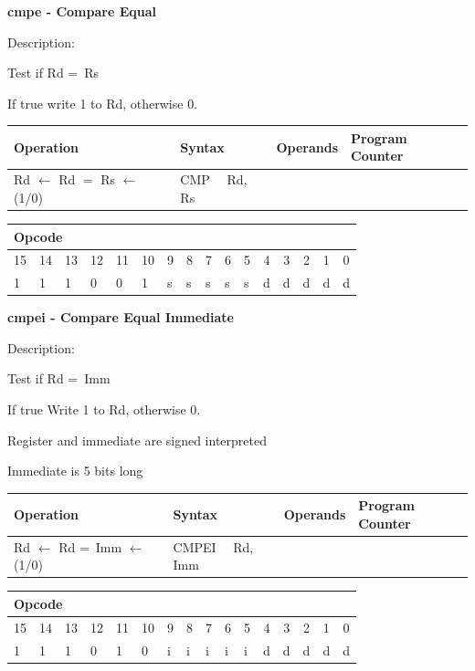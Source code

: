 \documentclass[%
	pdftex,
	a4paper,
	oneside,
	bibtotoc,%
	idxtotoc,%
	bibtotocnumbered,
	halfparskip,%
]{scrbook}
\begin{document}
\bigskip

\textbf{cmpe - Compare Equal}

Description:

Test if Rd =\ Rs

If true write 1 to Rd, otherwise 0.

\begin{tabular}{|l|l|l|l|}
\hline
Operation & Syntax & Operands & Program Counter \\ \hline
Rd $\leftarrow $ Rd $=$ Rs $\leftarrow $ (1/0) & CMP \ \ Rd, Rs &  &  \\ 
\hline
\end{tabular}

\begin{tabular}{|c|c|c|c|c|c|c|c|c|c|c|c|c|c|c|c|}
\hline
\multicolumn{6}{|l|}{Opcode} & \multicolumn{5}{|l|}{} & \multicolumn{5}{|l|}{
} \\ \hline
15 & 14 & 13 & 12 & 11 & 10 & 9 & 8 & 7 & 6 & 5 & 4 & 3 & 2 & 1 & 0 \\ \hline
\multicolumn{1}{|l|}{1} & \multicolumn{1}{|l|}{1} & \multicolumn{1}{|l|}{1}
& \multicolumn{1}{|l|}{0} & \multicolumn{1}{|l|}{0} & \multicolumn{1}{|l|}{1}
& \multicolumn{1}{|l|}{s} & \multicolumn{1}{|l|}{s} & \multicolumn{1}{|l|}{s}
& \multicolumn{1}{|l|}{s} & \multicolumn{1}{|l|}{s} & \multicolumn{1}{|l|}{d}
& \multicolumn{1}{|l|}{d} & \multicolumn{1}{|l|}{d} & \multicolumn{1}{|l|}{d}
& \multicolumn{1}{|l|}{d} \\ \hline
\end{tabular}

\bigskip

\textbf{cmpei - Compare Equal Immediate}

Description:

Test if Rd =\ Imm

If true Write 1 to Rd, otherwise 0.

Register and immediate are signed interpreted

Immediate is 5 bits long

\begin{tabular}{|l|l|l|l|}
\hline
Operation & Syntax & Operands & Program Counter \\ \hline
Rd $\leftarrow $ Rd =\ Imm $\leftarrow $ (1/0) & CMPEI \ \ Rd, Imm &  &  \\ 
\hline
\end{tabular}

\begin{tabular}{|c|c|c|c|c|c|c|c|c|c|c|c|c|c|c|c|}
\hline
\multicolumn{6}{|l|}{Opcode} & \multicolumn{5}{|l|}{} & \multicolumn{5}{|l|}{
} \\ \hline
15 & 14 & 13 & 12 & 11 & 10 & 9 & 8 & 7 & 6 & 5 & 4 & 3 & 2 & 1 & 0 \\ \hline
\multicolumn{1}{|l|}{1} & \multicolumn{1}{|l|}{1} & \multicolumn{1}{|l|}{1}
& \multicolumn{1}{|l|}{0} & \multicolumn{1}{|l|}{1} & \multicolumn{1}{|l|}{0}
& \multicolumn{1}{|l|}{i} & \multicolumn{1}{|l|}{i} & \multicolumn{1}{|l|}{i}
& \multicolumn{1}{|l|}{i} & \multicolumn{1}{|l|}{i} & \multicolumn{1}{|l|}{d}
& \multicolumn{1}{|l|}{d} & \multicolumn{1}{|l|}{d} & \multicolumn{1}{|l|}{d}
& \multicolumn{1}{|l|}{d} \\ \hline
\end{tabular}
\end{document}
